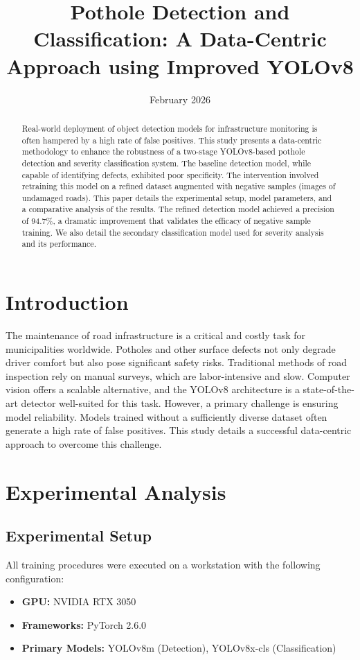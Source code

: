 \documentclass[twocolumn]{article}
\title{\textbf{Pothole Detection and Classification: A Data-Centric Approach using Improved YOLOv8}}
\date{February 2026}
\begin{document}
\maketitle

\begin{abstract}
\noindent Real-world deployment of object detection models for infrastructure monitoring is often hampered by a high rate of false positives. This study presents a data-centric methodology to enhance the robustness of a two-stage YOLOv8-based pothole detection and severity classification system. The baseline detection model, while capable of identifying defects, exhibited poor specificity. The intervention involved retraining this model on a refined dataset augmented with negative samples (images of undamaged roads). This paper details the experimental setup, model parameters, and a comparative analysis of the results. The refined detection model achieved a precision of 94.7\%, a dramatic improvement that validates the efficacy of negative sample training. We also detail the secondary classification model used for severity analysis and its performance.
\end{abstract}

\section{Introduction}
The maintenance of road infrastructure is a critical and costly task for municipalities worldwide. Potholes and other surface defects not only degrade driver comfort but also pose significant safety risks. Traditional methods of road inspection rely on manual surveys, which are labor-intensive and slow. Computer vision offers a scalable alternative, and the YOLOv8 architecture \cite{yolov8_ultralytics} is a state-of-the-art detector well-suited for this task. However, a primary challenge is ensuring model reliability. Models trained without a sufficiently diverse dataset often generate a high rate of false positives. This study details a successful data-centric approach to overcome this challenge.

\section{Experimental Analysis}

\subsection{Experimental Setup}
All training procedures were executed on a workstation with the following configuration:
\begin{itemize}
    \item \textbf{GPU:} NVIDIA RTX 3050
    \item \textbf{Frameworks:} PyTorch 2.6.0 \cite{NEURIPS2019_9015}
    \item \textbf{Primary Models:} YOLOv8m (Detection), YOLOv8x-cls (Classification)
\end{itemize}
\end{document}
